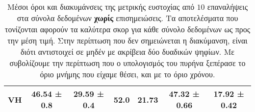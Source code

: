 \begin{table}[]
\begin{adjustbox}{angle=90}
{{\begin{tabular}{|l|c|c|c|c|c|c|}
VH              &   46.54 ± 0.8 &   29.59 ± 0.4 &              52.0 &            21.73 &      47.32 ± 0.66 &      17.92 ± 0.42 \\\hline
\end{tabular}
}
}
\end{adjustbox}
\caption[Μέσοι όροι και διακυμάνσεις της μετρικής ευστοχίας από $10$ επαναλήψεις   στα σύνολα δεδομένων χωρίς επισημειώσεις.]{\small Μέσοι όροι και διακυμάνσεις της μετρικής ευστοχίας από $10$ επαναλήψεις   στα σύνολα δεδομένων \textbf{χωρίς} επισημειώσεις. Τα αποτελέσματα που τονίζονται αφορούν τα καλύτερα σκορ για κάθε σύνολο δεδομένων ως προς την μέση τιμή. Στην περίπτωση που δεν σημειώνεται η διακύμανση, είναι διότι αντιστοιχεί σε μηδέν με ακρίβεια δύο δυαδικών ψηφίων. Με  συβολίζουμε την περίπτωση που ο υπολογισμός του πυρήνα ξεπέρασε το όριο μνήμης που είχαμε θέσει, και με  το όριο χρόνου.}
\label{tab:acc:unlabelled}
\end{table}


